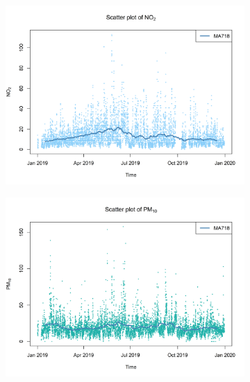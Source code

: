 \documentclass[a4paper, 10pt]{article}
\begin{document}
\begin{flushleft}
      \begin{figure}[H]
         \centering
         \begin{subfigure}[t]{0.48\linewidth}
            \centering
            \includegraphics[width=\linewidth]{../img/no2_scatter_2019.png}
         \end{subfigure}
         \hfill
         \begin{subfigure}[t]{0.48\linewidth}
            \centering
            \includegraphics[width=\linewidth]{../img/pm10_scatter_2019.png}
         \end{subfigure}

         \vfill


\end{figure}
\end{flushleft}
\end{document}
